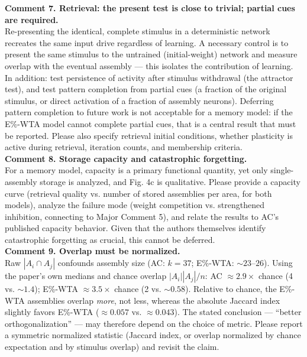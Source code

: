 \documentclass[a4paper, 11pt]{article}
\begin{document}
\noindent \textbf{Comment 7. Retrieval: the present test is close to trivial; partial cues are required.}\\
Re-presenting the identical, complete stimulus in a deterministic network recreates the same input drive regardless of learning. A necessary control is to present the same stimulus to the untrained (initial-weight) network and measure overlap with the eventual assembly — this isolates the contribution of learning. In addition: test persistence of activity after stimulus withdrawal (the attractor test), and test pattern completion from partial cues (a fraction of the original stimulus, or direct activation of a fraction of assembly neurons). Deferring pattern completion to future work is not acceptable for a memory model: if the E\%-WTA model cannot complete partial cues, that is a central result that must be reported. Please also specify retrieval initial conditions, whether plasticity is active during retrieval, iteration counts, and membership criteria.\\

\noindent\textbf{Comment 8. Storage capacity and catastrophic forgetting.}\\
For a memory model, capacity is a primary functional quantity, yet only single-assembly storage is analyzed, and Fig. 4c is qualitative. Please provide a capacity curve (retrieval quality vs. number of stored assemblies per area, for both models), analyze the failure mode (weight competition vs. strengthened inhibition, connecting to Major Comment 5), and relate the results to AC's published capacity behavior. Given that the authors themselves identify catastrophic forgetting as crucial, this cannot be deferred.\\

\noindent\textbf{Comment 9. Overlap must be normalized.}\\
Raw $|A_i \cap A_j|$ confounds assembly size (AC: $k = 37$; E\%-WTA: $\sim23\text{--}26$). Using the paper's own medians and chance overlap $|A_i||A_j|/n$: AC $\approx 2.9\times$ chance (4 vs. $\sim1.4$); E\%-WTA $\approx 3.5\times$ chance (2 vs. $\sim0.58$). Relative to chance, the E\%-WTA assemblies overlap \emph{more}, not less, whereas the absolute Jaccard index slightly favors E\%-WTA ($\approx0.057$ vs. $\approx0.043$). The stated conclusion — ``better orthogonalization'' — may therefore depend on the choice of metric. Please report a symmetric normalized statistic (Jaccard index, or overlap normalized by chance expectation and by stimulus overlap) and revisit the claim.\\
\end{document}
